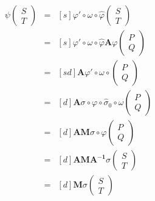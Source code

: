 \documentclass[11pt]{article}
\begin{document}
\begin{eqnarray*}
	[s]\psi\begin{pmatrix} S \\ T \end{pmatrix} & = & [s]\varphi'\circ\omega\circ
	\widehat\varphi\begin{pmatrix} S \\ T \end{pmatrix} \\
																							&=& [s]\varphi'\circ\omega\circ\widehat
																							\varphi\mathbf A\varphi
																							\begin{pmatrix} P \\ Q \end{pmatrix} \\
																							& =&[sd]\mathbf A\varphi'\circ\omega\circ
																							\begin{pmatrix} P \\ Q \end{pmatrix}  \\
																							&=&[d]\mathbf A\sigma\circ\varphi\circ\widehat\sigma_0
																							\circ\omega\begin{pmatrix} P \\ Q \end{pmatrix}  \\
																							&=&[d]\mathbf{AM}\sigma\circ\varphi
																							\begin{pmatrix} P \\ Q \end{pmatrix} \\
																							&=&[d]\mathbf{AMA^{-1}}\sigma\begin{pmatrix} S \\ T \end{pmatrix} \\
																							&=&[d]\mathbf{M}\sigma\begin{pmatrix} S \\ T \end{pmatrix} 
\end{eqnarray*}


		



		
		
	
\end{document}

